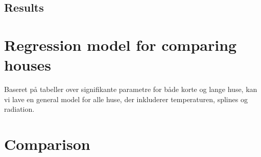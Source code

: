
\subsection{Results}

\section{Regression model for comparing houses}
Baseret på tabeller over signifikante parametre for både korte og lange huse, kan vi lave en general model for alle huse, der inkluderer temperaturen, splines og radiation. 

\section{Comparison}
